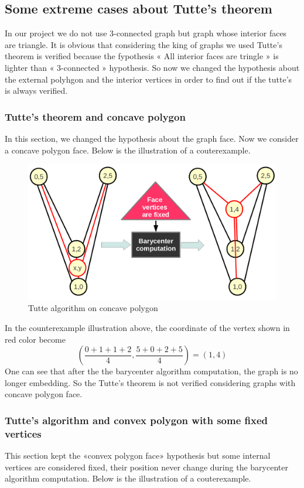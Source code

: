 \subsection{Some extreme cases about Tutte's theorem}
In our project we do not use 3-connected graph but graph whose interior faces are triangle. It is obvious that considering the king of graphs we used Tutte's theorem is verified because the fypothesis « All interior faces are tringle » is lighter than « 3-connected » hypothesis. So now we changed the hypothesis about the external polyhgon and the interior vertices in order to find out if the tutte's  is always verified.  

\subsubsection{Tutte's theorem and concave polygon}

In this section, we changed the hypothesis about the graph face. Now we consider a concave polygon face. Below is the illustration of a couterexample. 

\begin {figure}[H]
  \centering
  \includegraphics[scale=0.3]{img/tutte2.png}
  \caption{Tutte algorithm on concave polygon}
  \label{tutte2}
\end {figure}
\noindent
In the counterexample illustration above, the coordinate of the vertex shown in red color become $$(\frac{0+1+1+2}{4} , \frac{5+0+2+5}{4}) = (1 , 4)$$
One can see that after the the barycenter algorithm computation, the graph is no longer embedding. So the Tutte's theorem is not verified considering graphs with concave polygon face. 

\subsubsection{Tutte's algorithm and convex polygon with some fixed vertices}
This section kept the «convex polygon face» hypothesis but some internal vertices are considered fixed, their position never change during the barycenter algorithm computation. Below is the illustration of a couterexample. 

